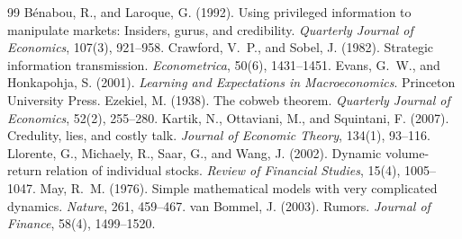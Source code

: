 \documentclass[11pt,a4paper]{article}
\theoremstyle{plain}
\theoremstyle{definition}
\theoremstyle{remark}
\begin{document}
\begin{thebibliography}{99}
 B\'enabou, R., and Laroque, G. (1992). Using privileged information to manipulate markets: Insiders, gurus, and credibility. \emph{Quarterly Journal of Economics}, 107(3), 921--958.
 Crawford, V.~P., and Sobel, J. (1982). Strategic information transmission. \emph{Econometrica}, 50(6), 1431--1451.
 Evans, G.~W., and Honkapohja, S. (2001). \emph{Learning and Expectations in Macroeconomics}. Princeton University Press.
 Ezekiel, M. (1938). The cobweb theorem. \emph{Quarterly Journal of Economics}, 52(2), 255--280.
 Kartik, N., Ottaviani, M., and Squintani, F. (2007). Credulity, lies, and costly talk. \emph{Journal of Economic Theory}, 134(1), 93--116.
 Llorente, G., Michaely, R., Saar, G., and Wang, J. (2002). Dynamic volume-return relation of individual stocks. \emph{Review of Financial Studies}, 15(4), 1005--1047.
 May, R.~M. (1976). Simple mathematical models with very complicated dynamics. \emph{Nature}, 261, 459--467.
 van Bommel, J. (2003). Rumors. \emph{Journal of Finance}, 58(4), 1499--1520.
\end{thebibliography}
\end{document}
